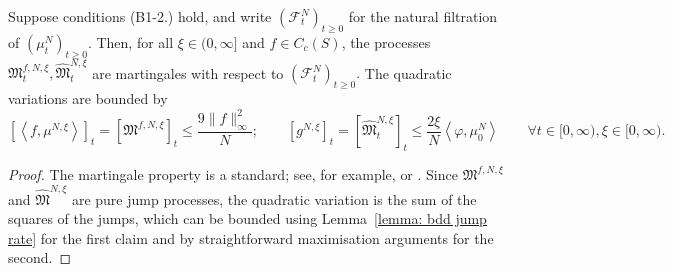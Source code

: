 \begin{lemma}\label{lemma: qvar}
Suppose conditions (B1-2.) hold, and write $(\mathcal{F}^{N}_t)_{t\ge 0}$ for the natural filtration of $(\mu^N_t)_{t\ge 0}$. Then, for all $\xi \in (0, \infty]$ and $f\in C_c(S)$, the processes $\mathfrak{M}_t^{f,N,\xi}, \widehat{\mathfrak{M}}_t^{N,\xi}$ are martingales with respect to $(\mathcal{F}^N_t)_{t\ge 0}.$
The quadratic variations are bounded by
\begin{equation*}
    \left[\left<f, \mu^{N,\xi}\right>\right]_t
    = \left[\mathfrak{M}^{f,N,\xi}\right]_t
    \leq \frac{9 \|f\|_\infty^2}{N}; \qquad
    \left[g^{N,\xi}\right]_t
    = \left[\widehat{\mathfrak{M}}_t^{N,\xi}\right]_t
    \leq \frac{2\xi}{N}\left<\varphi, \mu^N_0\right>  \qquad \forall t \in [0,\infty), \xi \in [0,\infty).
\end{equation*}
\end{lemma}
\begin{proof}
The martingale property is a standard; see, for example, \cite[Chapter 4, Proposition 1.7]{EK86} or \cite[Lemma 19.21]{K02}.
Since $\mathfrak{M}^{f,N,\xi}$ and $\widehat{\mathfrak{M}}^{N,\xi}$ are pure jump processes, the quadratic variation is the sum of the squares of the jumps, which can be bounded using Lemma~\ref{lemma: bdd jump rate} for the first claim and by straightforward maximisation arguments for the second.
\end{proof}

\iffalse Having now proven the tightness, we will argue that the only possible limit point is the deterministic path $(\mu_t)_{t\ge 0}$ given as the solution to (\ref{eq: E+G}). \fi

